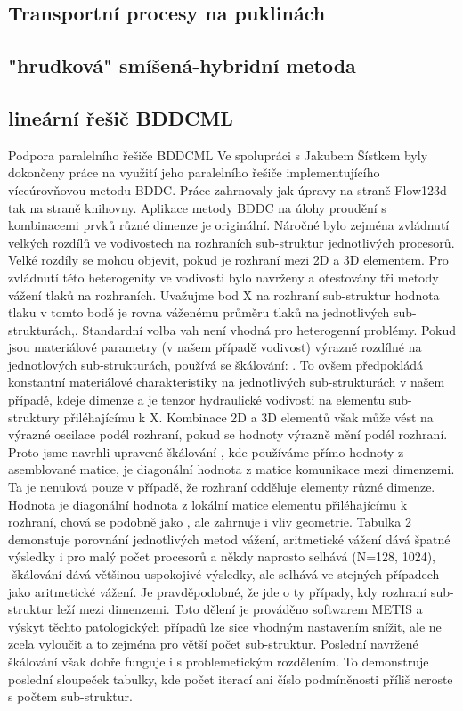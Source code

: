 \documentclass[11pt]{report}
\begin{document}
\subsection{Transportní procesy na puklinách}
\label{sc:ad_on_fractures}


\subsection{"hrudková" smíšená-hybridní metoda}
\subsection{lineární řešič BDDCML}
Podpora paralelního řešiče BDDCML
Ve spolupráci s Jakubem Šístkem byly dokončeny práce na využití jeho paralelního 
řešiče implementujícího víceúrovňovou metodu BDDC. Práce zahrnovaly jak úpravy 
na straně Flow123d tak na straně knihovny. Aplikace metody BDDC na úlohy 
proudění s kombinacemi prvků různé dimenze je originální. Náročné bylo zejména 
zvládnutí velkých rozdílů ve vodivostech na rozhraních sub-struktur jednotlivých 
procesorů. Velké rozdíly se mohou objevit, pokud je rozhraní mezi 2D a 3D 
elementem. Pro zvládnutí této heterogenity ve vodivosti bylo navrženy a 
otestovány tři metody vážení tlaků na rozhraních. Uvažujme bod X na rozhraní 
sub-struktur hodnota tlaku v tomto bodě je rovna váženému průměru tlaků na 
jednotlivých sub-strukturách,. Standardní volba vah není vhodná pro heterogenní 
problémy. Pokud jsou materiálové parametry (v našem případě vodivost) výrazně 
rozdílné na jednotlových sub-strukturách, používá se škálování: . To ovšem 
předpokládá konstantní materiálové charakteristiky na jednotlivých 
sub-strukturách v našem případě, kdeje dimenze a je tenzor hydraulické vodivosti 
na elementu sub-struktury přiléhajícímu k X. Kombinace 2D a 3D elementů však 
může vést na výrazné oscilace podél rozhraní, pokud se hodnoty výrazně mění 
podél rozhraní. Proto jsme navrhli upravené škálování , kde používáme přímo 
hodnoty z asemblované matice, je diagonální hodnota z matice komunikace mezi 
dimenzemi. Ta je nenulová pouze v případě, že rozhraní odděluje elementy různé 
dimenze. Hodnota je diagonální hodnota z lokální matice elementu přiléhajícímu k 
rozhraní, chová se podobně jako , ale zahrnuje i vliv geometrie. Tabulka 2 
demonstuje porovnání jednotlivých metod vážení, aritmetické vážení dává špatné 
výsledky i pro malý počet procesorů a někdy naprosto selhává (N=128, 1024), 
-škálování dává většinou uspokojivé výsledky, ale selhává ve stejných případech 
jako aritmetické vážení. Je pravděpodobné, že jde o ty případy, kdy rozhraní 
sub-struktur leží mezi dimenzemi. Toto dělení je prováděno softwarem METIS a 
výskyt těchto patologických případů lze sice vhodným nastavením snížit, ale ne 
zcela vyloučit a to zejména pro větší počet sub-struktur. Poslední navržené 
škálování  však dobře funguje i s problemetickým rozdělením. To demonstruje 
poslední sloupeček tabulky, kde
počet iterací ani číslo podmíněnosti příliš neroste s počtem sub-struktur.
\end{document}
